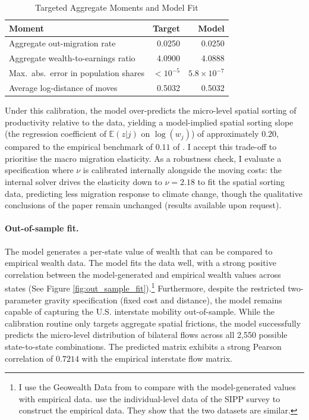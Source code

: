 \documentclass[11pt, a4paper]{article}
\begin{document}
\begin{table}[!htb]
\centering
\small
\caption{Targeted Aggregate Moments and Model Fit}
\label{tab:calibration_fit}
\begin{tabular}{lrr}
\toprule
Moment & Target & Model \\
\midrule
Aggregate out-migration rate & 0.0250 & 0.0250 \\
Aggregate wealth-to-earnings ratio & 4.0900 & 4.0888 \\
Max.\ abs.\ error in population shares & $<10^{-5}$ & $5.8 \times 10^{-7}$ \\
Average log-distance of moves & 0.5032 & 0.5032 \\ 
\bottomrule
\end{tabular}
\end{table}

Under this calibration, the model over-predicts the micro-level spatial sorting of productivity relative to the data, yielding a model-implied spatial sorting slope (the regression coefficient of $\mathbb{E}(z|j)$ on $\log(w_j)$) of approximately $0.20$, compared to the empirical benchmark of $0.11$ of \citet{dvorkin_geography_2025}. I accept this trade-off to prioritise the macro migration elasticity. As a robustness check, I evaluate a specification where $\nu$ is calibrated internally alongside the moving costs: the internal solver drives the elasticity down to $\nu = 2.18$ to fit the spatial sorting data, predicting less migration response to climate change, though the qualitative conclusions of the paper remain unchanged (results available upon request).

\paragraph{Out-of-sample fit.} The model generates a per-state value of wealth that can be compared to empirical wealth data. The model fits the data well, with a strong positive correlation between the model-generated and empirical wealth values across states (See Figure \ref{fig:out_sample_fit}).\footnote{I use the Geowealth Data from \cite{suss_geowealth-us_2024} to compare with the model-generated values with empirical data. \cite{dvorkin_geography_2025} use the individual-level data of the SIPP survey to construct the empirical data. They show that the two datasets are similar.} Furthermore, despite the restricted two-parameter gravity specification (fixed cost and distance), the model remains capable of capturing the U.S. interstate mobility out-of-sample. While the calibration routine only targets aggregate spatial frictions, the model successfully predicts the micro-level distribution of bilateral flows across all 2,550 possible state-to-state combinations. The predicted matrix exhibits a strong Pearson correlation of $0.7214$ with the empirical interstate flow matrix.
\end{document}
